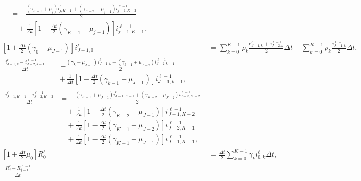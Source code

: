 \documentclass[USenglish]{article}
\begin{document}
\begin{subequations}
\begin{align}
\begin{split}
      &= - \frac{(\gamma_{K - 1} + \mu_j) i_{j, K - 1}^{\ell}
        + (\gamma_{K - 2} + \mu_{j - 1}) i_{j - 1, K - 2}^{\ell - 1}}
      {2}
      \\ & \quad {}
      + \frac{1}{\Delta t} \left[
        1 - \frac{\Delta t}{2} (\gamma_{K - 1} + \mu_{j - 1})
      \right] i_{j - 1, K - 1}^{\ell - 1},
    \end{split}
    \\
    \left[1 + \frac{\Delta t}{2} (\gamma_0 + \mu_{J - 1})\right]
    i_{J - 1, 0}^{\ell}
    &= \sum_{k = 0}^{K - 1} \rho_k
    \frac{e_{J - 1, k}^{\ell} + e_{J - 2, k}^{\ell - 1}} {2}
    \Delta t
    + \sum_{k = 0}^{K - 1} \rho_k
    \frac{e_{J - 1, k}^{\ell - 1}} {2}
    \Delta t,
    \\
    \begin{split}
      \frac{i_{J - 1, k}^{\ell} - i_{J - 2, k - 1}^{\ell - 1}}{\Delta t}
      &= - \frac{(\gamma_k + \mu_{J - 1}) i_{J - 1, k}^{\ell}
        + (\gamma_{k - 1} + \mu_{J - 2}) i_{J - 2, k - 1}^{\ell - 1}}
      {2}
      \\ & \quad {}
      + \frac{1}{\Delta t} \left[
        1 - \frac{\Delta t}{2} (\gamma_{k - 1} + \mu_{J - 1})
      \right] i_{J - 1, k - 1}^{\ell - 1},
    \end{split}
    \\
    \begin{split}
      \frac{i_{J - 1, K - 1}^{\ell} - i_{J - 2, K - 2}^{\ell - 1}}{\Delta t}
      &= - \frac{(\gamma_{K - 1} + \mu_{J - 1}) i_{J - 1, K - 1}^{\ell}
        + (\gamma_{K - 2} + \mu_{J - 2}) i_{J - 2, K - 2}^{\ell - 1}}
      {2}
      \\ & \quad {}
      + \frac{1}{\Delta t} \left[
        1 - \frac{\Delta t}{2} (\gamma_{K - 2} + \mu_{J - 1})
      \right] i_{J - 1, K - 2}^{\ell - 1}
      \\ & \quad {}
      + \frac{1}{\Delta t} \left[
        1 - \frac{\Delta t}{2} (\gamma_{K - 1} + \mu_{J - 2})
      \right] i_{J - 2, K - 1}^{\ell - 1}
      \\ & \quad {}
      + \frac{1}{\Delta t} \left[
        1 - \frac{\Delta t}{2} (\gamma_{K - 1} + \mu_{J - 1})
      \right] i_{J - 1, K - 1}^{\ell - 1},
    \end{split}
    \\
    \left[1 + \frac{\Delta t}{2} \mu_0\right] R_0^{\ell}
    &= \frac{\Delta t}{2} \sum_{k = 0}^{K - 1}
    \gamma_k i_{0, k}^{\ell} \Delta t,
    \\
    \begin{split}
      \frac{R_j^{\ell} - R_{j - 1}^{\ell - 1}}{\Delta t}

\end{split}
\end{align}
\end{subequations}
\end{document}
